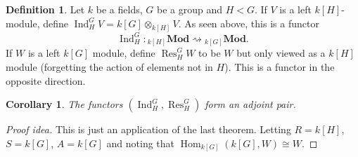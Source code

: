 \documentclass[paper=a4, fontsize=12pt]{scrartcl} %
\newtheorem{cor}[thm]{Corollary}
\theoremstyle{definition}
\newtheorem{defn}[thm]{Definition}
\theoremstyle{remark}
\DeclareMathOperator{\Ind}{Ind}
\DeclareMathOperator{\Res}{Res}
\DeclareMathOperator{\Hom}{Hom}
\begin{document}
\begin{defn}
	Let $k$ be a fields, $G$ be a group and $H < G$. If $V$ is a left $k[H]$-module, define $\Ind_H^GV = k[G] \otimes_{k[H]} V$. As seen above, this is a functor 
	$$\Ind_H^G : {}_{k[H]}\textbf{Mod} \rightsquigarrow {}_{k[G]}\textbf{Mod}.$$
	If $W$ is a left $k[G]$ module, define $\Res_H^GW$ to be $W$ but only viewed as a $k[H]$ module (forgetting the action of elements not in $H$). This is a functor in the opposite direction.
\end{defn}
\begin{cor}
	The functors $(\Ind_H^G, \Res_H^G)$ form an adjoint pair.
\end{cor}
\begin{proof}[Proof idea]
	This is just an application of the last theorem. Letting $R= k[H]$, $S = k[G]$, $A = k[G]$ and noting that $\Hom_{k[G]}(k[G], W) \cong W$.
\end{proof}
\end{document}
